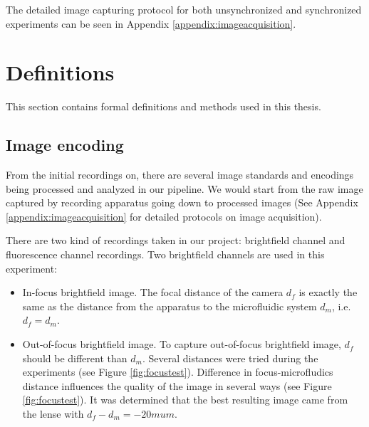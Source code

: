 \documentclass[pdftex,12pt,a4paper]{report}
\begin{document}
The detailed image capturing protocol for both unsynchronized and synchronized experiments can be seen in Appendix \ref{appendix:imageacquisition}.


\section{Definitions}

This section contains formal definitions and methods used in this thesis.

\subsection{Image encoding}
\label{subsection:image_encoding}

From the initial recordings on, there are several image standards and encodings being processed and analyzed in our pipeline. We would start from the raw image captured by recording apparatus going down to processed images (See Appendix \ref{appendix:imageacquisition} for detailed protocols on image acquisition).

There are two kind of recordings taken in our project: brightfield channel and fluorescence channel recordings. Two brightfield channels are used in this experiment:

\begin{itemize}
\item In-focus brightfield image. The focal distance of the camera $d_f$ is exactly the same as the distance from the apparatus to the microfluidic system $d_m$, i.e. $d_f = d_m$.
\item Out-of-focus brightfield image. To capture out-of-focus brightfield image, $d_f$ should be different than $d_m$. Several distances were tried during the experiments (see Figure \ref{fig:focustest}). Difference in focus-microfludics distance influences the quality of the image in several ways (see Figure \ref{fig:focustest}). It was determined that the best resulting image came from the lense with $d_f - d_m = -20 mu m$.
\end{itemize}
\end{document}
